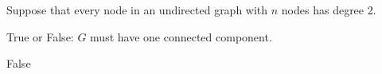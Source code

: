 \begin{prob}
    Suppose that every node in an undirected graph with $n$ nodes has degree 2.

    True or False: $G$ must have one connected component.

    \tF{}

    \begin{soln}
        False
    \end{soln}
\end{prob}
